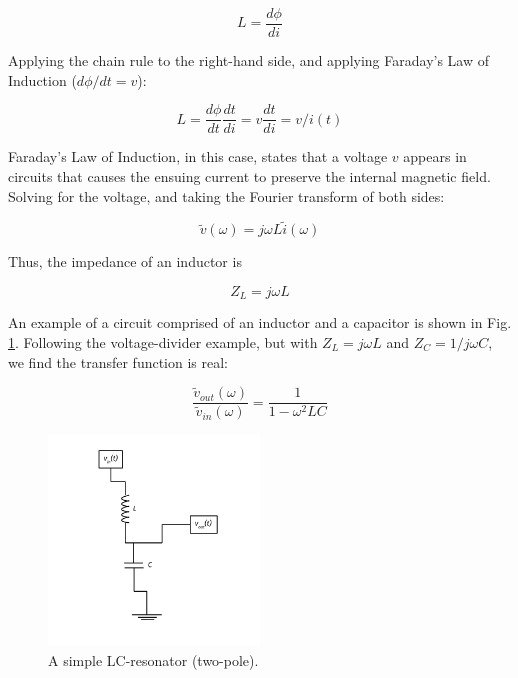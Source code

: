 \documentclass[12pt]{article}
\begin{document}
\begin{equation}
L = \frac{d\phi}{di}
\label{eq:eq14}
\end{equation}

Applying the chain rule to the right-hand side, and applying Faraday's Law of Induction ($d\phi/dt = v$):

\begin{equation}
L = \frac{d\phi}{dt}\frac{dt}{di} = v\frac{dt}{di} = v/i(t)
\label{eq:eq15}
\end{equation}

Faraday's Law of Induction, in this case, states that a voltage $v$ appears in circuits that causes the ensuing current to preserve the internal magnetic field.  Solving for the voltage, and taking the Fourier transform of both sides:

\begin{equation}
\tilde{v}(\omega) = j\omega L \tilde{i}(\omega)
\label{eq:eq16}
\end{equation}

Thus, the impedance of an inductor is 

\begin{equation}
\boxed{
Z_L = j\omega L
}
\label{eq:eq17}
\end{equation}

An example of a circuit comprised of an inductor and a capacitor is shown in Fig. \ref{fig:fig4}.  Following the voltage-divider example, but with $Z_L = j\omega L$ and $Z_C = 1/j\omega C$, we find the transfer function is real:

\begin{equation}
\frac{\tilde{v}_{out}(\omega)}{\tilde{v}_{in}(\omega)} = \frac{1}{1-\omega^2 LC}
\label{eq:eq18}
\end{equation}

\begin{figure}
\centering
\includegraphics[width=0.5\textwidth,trim=0cm 1cm 0cm 0cm,clip=true]{LowPassLC.pdf}
\caption{\label{fig:fig4} A simple LC-resonator (two-pole).}
\end{figure}
\end{document}
